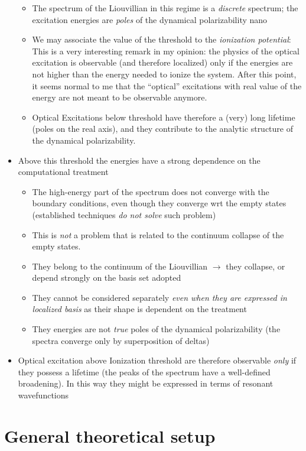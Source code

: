 \documentclass[a4paper]{article}
\begin{document}
\begin{itemize}
\begin{itemize}
\item The spectrum of the Liouvillian in this regime is a \emph{discrete} spectrum; the excitation energies are \emph{poles} of the dynamical polarizability
nano\item We may associate the value of the threshold to the \emph{ionization potential}: This is a very interesting remark in my opinion: the physics of the optical excitation is observable 
(and therefore localized) only if the energies are not higher than the energy needed to ionize the system. After this point, it seems normal to me that the ``optical'' excitations with 
real value of the energy are not  meant to be observable anymore.
\item Optical Excitations below threshold have therefore a (very) long lifetime (poles on the real axis), and they contribute to the analytic structure of the dynamical polarizability.
\end{itemize}
\item Above this threshold the energies have a strong dependence on the computational treatment
\begin{itemize}
\item The high-energy part of the 
spectrum does not converge with the 
boundary conditions, even though they converge wrt the empty states (established techniques \emph{do not solve} such problem)
\item This is \emph{not} a problem that is related to the continuum collapse of the empty states.
\item They belong to the continuum of  the Liouvillian $\rightarrow$ they collapse, or depend strongly on the basis set adopted
\item They cannot be considered separately \emph{even when they are expressed in localized basis} as 
their shape is dependent on the treatment
\item They energies are not \emph{true} poles of the dynamical polarizability (the spectra converge only by superposition of deltas)
\end{itemize}
\item Optical excitation above Ionization threshold are therefore observable \emph{only} if they possess a lifetime (the peaks of the spectrum have a well-defined broadening). 
In this way they might be expressed in terms of resonant wavefunctions
\end{itemize}

\section{General theoretical setup}
\end{document}
